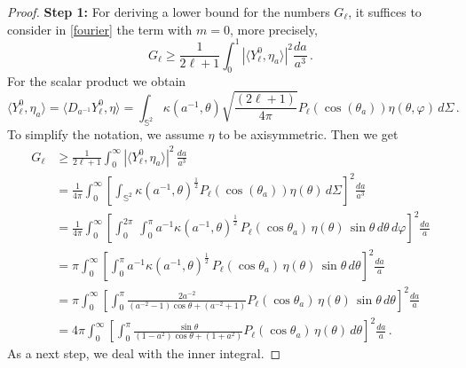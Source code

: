 \documentclass[a4paper,11pt,DIV=11,%
abstract=on%
]{scrartcl}
\begin{document}
\begin{proof}
	\textbf{Step 1:} 
	For deriving a lower bound for the numbers $G_\ell$, it suffices 
	to consider in \eqref{fourier} the term
	with $m=0$, more precisely,
	$$G_\ell\geq\frac{1}{2\ell+1}\int_0^1 |\langle Y_\ell^0, \eta_a \rangle |^2 \frac{da}{a^3}\,.$$
	For the scalar product we obtain
	\[
	\langle Y_\ell^0, \eta_a \rangle
	=\langle D_{a^{-1}}Y_\ell^0, \eta\rangle
	=\int_{\mathbb S^2} \kappa(a^{-1},\theta) \sqrt{\frac{(2\ell+1)}{4\pi}}
	P_\ell(\cos(\theta_a)) \eta(\theta,\varphi)\, d\Sigma\,.
	\]
	To simplify the notation, we assume $\eta$ to be axisymmetric. Then we get
	\begin{align*}
		G_\ell
		&\geq \frac{1}{2\ell+1} \int_0^\infty
		|\langle Y_\ell^0, \eta_a \rangle|^2 \, \frac{da}{a^3}\\
		&= \frac1{4\pi}\int_0^\infty \left[
		\int_{\mathbb S^2} \kappa (a^{-1},\theta)^{\frac12} P_\ell(\cos(\theta_a)) \eta(\theta)
		\, d\Sigma \right]^2 \frac{da}{a^3}\\
		&=\frac1{4\pi}\int_0^\infty \left[
		\int_0^{2\pi} \, \int_0^\pi
		a^{-1} \kappa(a^{-1},\theta)^{\frac12}\, P_\ell(\cos\theta_a)\, \eta(\theta)\,
		\sin\theta\, d\theta\, d\varphi \right]^2 \frac{da}{a}\\
		&=\pi \int_0^\infty \left[	\int_0^\pi
		a^{-1} \kappa(a^{-1},\theta)^{\frac12}\, P_\ell(\cos\theta_a)\, \eta(\theta)\,
		\sin\theta\, d\theta \right]^2 \frac{da}{a}\\
		&=\pi\int_0^\infty \left[ \int_0^\pi
		\frac{2a^{-2}}{(a^{-2}-1)\cos\theta+(a^{-2}+1)} P_\ell(\cos\theta_a)\, \eta(\theta)\,
		\sin\theta\, d\theta \right]^2 \frac{da}{a}\\
		&=4\pi \int_0^\infty \left[ \int_0^\pi
		\frac{\sin\theta}{(1-a^2)\cos\theta+(1+a^2)} P_\ell(\cos\theta_a)\, \eta(\theta)\,
		d\theta \right]^2 \frac{da}{a}\,.
	\end{align*}
	As a next step, we deal with the inner integral.
	

\end{proof}
\end{document}

